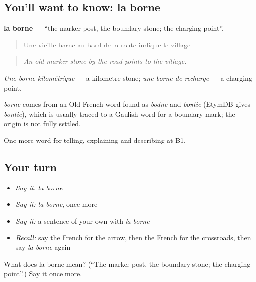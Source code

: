 \subsection*{You'll want to know: la borne}
\textbf{la borne} — \textquotedblleft{}the marker post, the boundary stone; the charging point\textquotedblright{}.

\begin{quote}
Une vieille borne au bord de la route indique le village.
\end{quote}

\begin{quote}
\emph{An old marker stone by the road points to the village.}
\end{quote}

\emph{Une borne kilométrique} — a kilometre stone; \emph{une borne de recharge} — a charging point.

\begin{cousinweb}
\emph{borne} comes from an Old French word found as \emph{bodne} and \emph{bontie} (EtymDB gives \emph{bontie}), which is usually traced to a Gaulish word for a boundary mark; the origin is not fully settled.
\end{cousinweb}

\begin{grammarlens}[title={What you've built}]
One more word for telling, explaining and describing at B1.
\end{grammarlens}

\subsection*{Your turn}
\begin{itemize}
\raggedright
  \item \emph{Say it:} \emph{la borne}
  \item \emph{Say it:} \emph{la borne}, once more
  \item \emph{Say it:} a sentence of your own with \emph{la borne}
  \item \emph{Recall:} say the French for the arrow, then the French for the crossroads, then say \emph{la borne} again
\end{itemize}

\begin{tcolorbox}[breakable,colback=teal!4,colframe=teal!35!black,title={Before you move on}]
What does la borne mean? (\textquotedblleft{}The marker post, the boundary stone; the charging point\textquotedblright{}.) Say it once more.
\end{tcolorbox}
